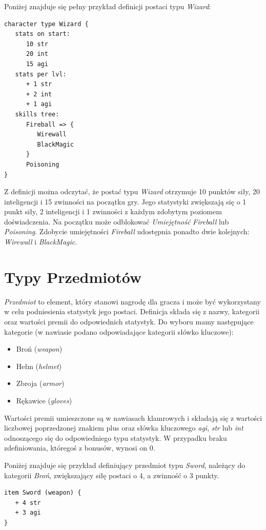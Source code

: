 \documentclass[openright]{xmgr}
\begin{document}
Poniżej znajduje się pełny przykład definicji postaci typu \textit{Wizard}:
\begin{verbatim}
character type Wizard {
   stats on start:
      10 str
      20 int
      15 agi
   stats per lvl:
      + 1 str
      + 2 int
      + 1 agi
   skills tree:
      Fireball => {
         Wirewall
         BlackMagic
      }
      Poisoning
}
\end{verbatim}
Z definicji można odczytać, że postać typu \textit{Wizard} otrzymuje 10 punktów siły, 20 inteligencji i 15 zwinności na początku gry.
Jego statystyki zwiększają się o 1 punkt siły, 2 inteligencji i 1 zwinności z każdym zdobytym poziomem doświadczenia.
Na początku może odblokować \textit{Umiejętność} \textit{Fireball} lub \textit{Poisoning}. Zdobycie umiejętności \textit{Fireball} udostępnia ponadto dwie kolejnych: \textit{Wirewall} i \textit{BlackMagic}. 

\section{Typy Przedmiotów}
\textit{Przedmiot} to element, który stanowi nagrodę dla gracza i może być wykorzystany w celu podniesienia statystyk jego postaci. Definicja składa się z nazwy, kategorii oraz wartości premii do odpowiednich statystyk.
Do wyboru mamy następujące kategorie (w nawiasie podano odpowiadające kategorii słówko kluczowe):
\begin{itemize}
	\item Broń (\textit{weapon})
	\item Hełm (\textit{helmet})
	\item Zbroja (\textit{armor})
	\item Rękawice (\textit{gloves})
\end{itemize}
Wartości premii umieszczone są w nawiasach klamrowych i składają się z wartości liczbowej poprzedzonej znakiem plus oraz słówka kluczowego \textit{agi}, \textit{str} lub \textit{int} odnoszącego się do odpowiedniego typu statystyk. W przypadku braku zdefiniowania, któregoś z bonusów, wynosi on 0.

Poniżej znajduje się przykład definiujący przedmiot typu \textit{Sword}, należący do kategorii \textit{Broń}, zwiększający siłę postaci o 4, a zwinność o 3 punkty.
\begin{verbatim}
item Sword (weapon) {
   + 4 str
   + 3 agi
}
\end{verbatim}
\end{document}
